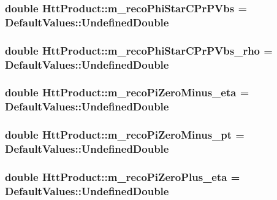 \label{classHttProduct_a497bb3a130adff99248aba9890339632}
\hypertarget{classHttProduct_a098ffec9c6c3ed02c71847654cbbd3d4}{
\subsubsection[{m\_\-recoPhiStarCPrPVbs}]{\setlength{\rightskip}{0pt plus 5cm}double {\bf HttProduct::m\_\-recoPhiStarCPrPVbs} = DefaultValues::UndefinedDouble}}
\label{classHttProduct_a098ffec9c6c3ed02c71847654cbbd3d4}
\hypertarget{classHttProduct_a5aede4ad7706e790207d27cdfe281525}{
\subsubsection[{m\_\-recoPhiStarCPrPVbs\_\-rho}]{\setlength{\rightskip}{0pt plus 5cm}double {\bf HttProduct::m\_\-recoPhiStarCPrPVbs\_\-rho} = DefaultValues::UndefinedDouble}}
\label{classHttProduct_a5aede4ad7706e790207d27cdfe281525}
\hypertarget{classHttProduct_abdeb3313e8426bbf9d2a4d888104651a}{
\subsubsection[{m\_\-recoPiZeroMinus\_\-eta}]{\setlength{\rightskip}{0pt plus 5cm}double {\bf HttProduct::m\_\-recoPiZeroMinus\_\-eta} = DefaultValues::UndefinedDouble}}
\label{classHttProduct_abdeb3313e8426bbf9d2a4d888104651a}
\hypertarget{classHttProduct_a7786e41a155cb50c5083eba8575cb262}{
\subsubsection[{m\_\-recoPiZeroMinus\_\-pt}]{\setlength{\rightskip}{0pt plus 5cm}double {\bf HttProduct::m\_\-recoPiZeroMinus\_\-pt} = DefaultValues::UndefinedDouble}}
\label{classHttProduct_a7786e41a155cb50c5083eba8575cb262}
\hypertarget{classHttProduct_a319d9cdf83b816f05085fbe62afe435c}{
\subsubsection[{m\_\-recoPiZeroPlus\_\-eta}]{\setlength{\rightskip}{0pt plus 5cm}double {\bf HttProduct::m\_\-recoPiZeroPlus\_\-eta} = DefaultValues::UndefinedDouble}}
